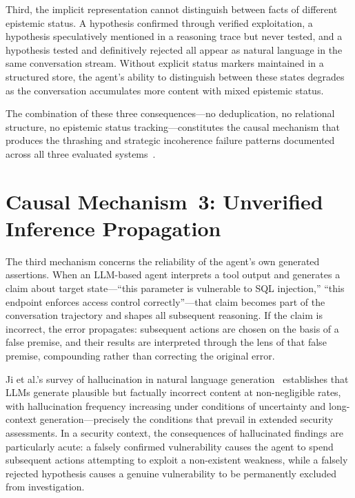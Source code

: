 \documentclass[12pt,a4paper,oneside,openany]{book}
\begin{document}
Third, the implicit representation cannot distinguish between facts of different epistemic status. A hypothesis confirmed through verified exploitation, a hypothesis speculatively mentioned in a reasoning trace but never tested, and a hypothesis tested and definitively rejected all appear as natural language in the same conversation stream. Without explicit status markers maintained in a structured store, the agent's ability to distinguish between these states degrades as the conversation accumulates more content with mixed epistemic status.

The combination of these three consequences---no deduplication, no relational structure, no epistemic status tracking---constitutes the causal mechanism that produces the thrashing and strategic incoherence failure patterns documented across all three evaluated systems~\citep{deng2024pentestgpt,happe2023hackerllm,xu2024autoattacker}.

\section{Causal Mechanism~3: Unverified Inference Propagation}

The third mechanism concerns the reliability of the agent's own generated assertions. When an LLM-based agent interprets a tool output and generates a claim about target state---``this parameter is vulnerable to SQL injection,'' ``this endpoint enforces access control correctly''---that claim becomes part of the conversation trajectory and shapes all subsequent reasoning. If the claim is incorrect, the error propagates: subsequent actions are chosen on the basis of a false premise, and their results are interpreted through the lens of that false premise, compounding rather than correcting the original error.

Ji et al.'s survey of hallucination in natural language generation~\citep{ji2023survey} establishes that LLMs generate plausible but factually incorrect content at non-negligible rates, with hallucination frequency increasing under conditions of uncertainty and long-context generation---precisely the conditions that prevail in extended security assessments. In a security context, the consequences of hallucinated findings are particularly acute: a falsely confirmed vulnerability causes the agent to spend subsequent actions attempting to exploit a non-existent weakness, while a falsely rejected hypothesis causes a genuine vulnerability to be permanently excluded from investigation.
\end{document}
